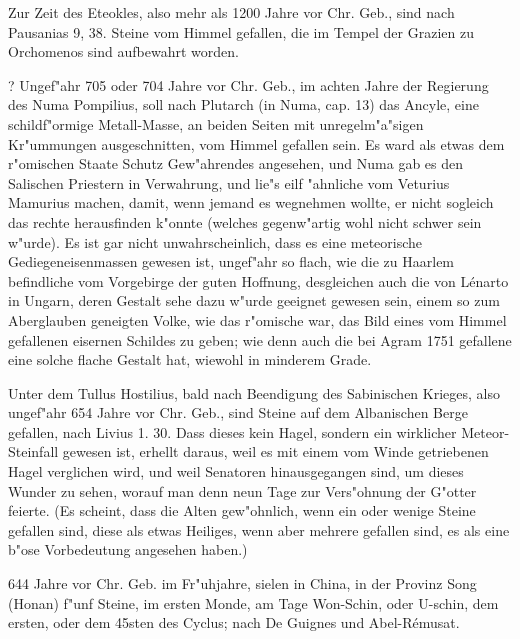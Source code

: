 \documentclass[a4paper, 11pt, oneside, polutonikogreek, german]{article}
\begin{document}
Zur Zeit des Eteokles, also mehr als 1200 Jahre vor Chr. Geb., sind nach Pausanias 9, 38. Steine vom Himmel gefallen, die im Tempel der Grazien zu Orchomenos sind aufbewahrt worden.

? Ungef"ahr 705 oder 704 Jahre vor Chr. Geb., im achten Jahre der Regierung des Numa Pompilius, soll nach Plutarch (in Numa, cap. 13) das Ancyle, eine schildf"ormige Metall-Masse, an beiden Seiten mit unregelm"a"sigen Kr"ummungen ausgeschnitten, vom Himmel gefallen sein. Es ward als etwas dem r"omischen Staate Schutz Gew"ahrendes angesehen, und Numa gab es den Salischen Priestern in Verwahrung, und lie"s eilf "ahnliche vom Veturius Mamurius machen, damit, wenn jemand es wegnehmen wollte, er nicht sogleich das rechte herausfinden k"onnte (welches gegenw"artig wohl nicht schwer sein w"urde). Es ist gar nicht unwahrscheinlich, dass es eine meteorische Gediegeneisenmassen gewesen ist, ungef"ahr so flach, wie die zu Haarlem befindliche vom Vorgebirge der guten Hoffnung, desgleichen auch die von Lénarto in Ungarn, deren Gestalt sehe dazu w"urde geeignet gewesen sein, einem so zum Aberglauben geneigten Volke, wie das r"omische war, das Bild eines vom Himmel gefallenen eisernen Schildes zu geben; wie denn auch die bei Agram 1751 gefallene eine solche flache Gestalt hat, wiewohl in minderem Grade.

Unter dem Tullus Hostilius, bald nach Beendigung des Sabinischen Krieges, also ungef"ahr 654 Jahre vor Chr. Geb., sind Steine auf dem Albanischen Berge gefallen, nach Livius 1. 30. Dass dieses kein Hagel, sondern ein wirklicher Meteor-Steinfall gewesen ist, erhellt daraus, weil es mit einem vom Winde getriebenen Hagel verglichen wird, und weil Senatoren hinausgegangen sind, um dieses Wunder zu sehen, worauf man denn neun Tage zur Vers"ohnung der G"otter feierte. (Es scheint, dass die Alten gew"ohnlich, wenn ein oder wenige Steine gefallen sind, diese als etwas Heiliges, wenn aber mehrere gefallen sind, es als eine b"ose Vorbedeutung angesehen haben.)

644 Jahre vor Chr. Geb. im Fr"uhjahre, sielen in China, in der Provinz Song (Honan) f"unf Steine, im ersten Monde, am Tage Won-Schin, oder U-schin, dem ersten, oder dem 45sten des Cyclus; nach De Guignes und Abel-Rémusat.
\end{document}
